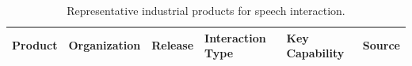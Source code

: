 \begin{table}[t]
    \centering
    \caption{Representative industrial products for speech interaction.}
    \label{tab:industrial-products}
    \small
    \begin{tabular}{l|l|l|l|l|l}
        \toprule
        Product & Organization & Release & Interaction Type & Key Capability & Source \\
        \midrule
        \bottomrule
    \end{tabular}
\end{table}
